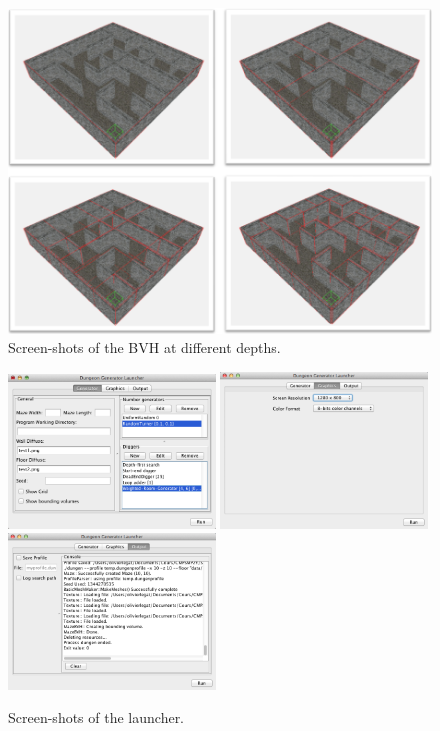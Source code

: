 \begin{figure}[h!]
\centering
\includegraphics[width=1\textwidth]{images/bvh-depths.png}
\caption{Screen-shots of the BVH at different depths.}
\end{figure}

\begin{figure}[h!]
\centering
\includegraphics[width=0.49\textwidth]{images/launcher00.png}
\includegraphics[width=0.49\textwidth]{images/launcher01.png}
\includegraphics[width=0.49\textwidth]{images/launcher02.png}
\caption{Screen-shots of the launcher.}
\end{figure}








